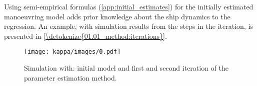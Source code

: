 \noindent Using semi-empirical formulas (\autoref{app:initial_estimates}) for the initially estimated manoeuvring model adds prior knowledge about the ship dynamics to the regression. An example, with simulation results from the steps in the iteration, is presented in \hyperref[\detokenize{01.01_method:iterations}]{\autoref{\detokenize{01.01_method:iterations}}}.


\begin{figure}[H]
    \centering
    \texttt{[image: kappa/images/0.pdf]}
    \caption{Simulation with: initial model and first and second iteration of the parameter estimation method.}
    \label{\detokenize{01.01_method:iterations}}
\end{figure}









